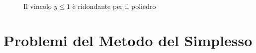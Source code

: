 \documentclass[10pt, letterpaper]{report}
\begin{document}
\begin{figure}[h]
    \caption{Il vincolo $y\le 1$ è ridondante per il poliedro}
\end{figure}

\section{Problemi del Metodo del Simplesso}
\end{document}
